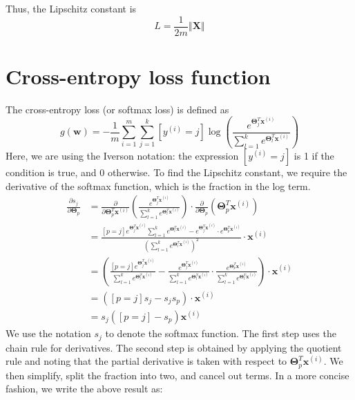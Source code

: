 \documentclass{article}
\begin{document}
Thus, the Lipschitz constant is
\[
    \boxed{
        L = \frac{1}{2m} \left\Vert \textbf{X} \right\Vert
    }
\]

\section{Cross-entropy loss function} 
The cross-entropy loss (or softmax loss) is defined as 
\[
    g(\textbf{w}) = -\frac{1}{m} \sum\limits_{i=1}^m \sum\limits_{j=1}^k [y^{(i)}=j] \log \left( \frac{e^{\boldsymbol\Theta_j^T \textbf{x}^{(i)}}}{\sum_{l=1}^k e^{\boldsymbol\Theta_l^T \textbf{x}^{(i)}}} \right)
\]
Here, we are using the Iverson notation: the expression $[y^{(i)}=j]$ is 1 if the condition is true, and 0 otherwise. To find the Lipschitz constant, we require the derivative of the softmax function, which is the fraction in the log term.
\[
    \begin{aligned} \frac{\partial s_j}{\partial \boldsymbol\Theta_p} &= \frac{\partial}{\partial \boldsymbol\Theta^T_p \textbf{x}^{(i)}} \left( \frac{e^{\boldsymbol\Theta^T_j \textbf{x}^{(i)}}}{\sum_{l=1}^k e^{\boldsymbol\Theta^T_l \textbf{x}^{(i)}}} \right) \cdot \frac{\partial}{\partial \boldsymbol\Theta_p} \left( \boldsymbol\Theta^T_p \textbf{x}^{(i)} \right)  \\ &= \frac{[p=j] e^{\boldsymbol\Theta^T_j \textbf{x}^{(i)}}\sum_{l=1}^k e^{\boldsymbol\Theta^T_l \textbf{x}^{(i)}} - e^{\boldsymbol\Theta^T_j \textbf{x}^{(i)}} \cdot e^{\boldsymbol\Theta^T_p \textbf{x}^{(i)}} }{\left( \sum_{l=1}^k e^{\boldsymbol\Theta^T_l \textbf{x}^{(i)}} \right)^2} \cdot \textbf{x}^{(i)} \\ &= \left( \frac{[p=j] e^{\boldsymbol\Theta^T_j \textbf{x}^{(i)}}}{\sum_{l=1}^k e^{\boldsymbol\Theta^T_l \textbf{x}^{(i)}}} - \frac{e^{\boldsymbol\Theta^T_j \textbf{x}^{(i)}}}{\sum_{l=1}^k e^{\boldsymbol\Theta^T_l \textbf{x}^{(i)}}} \cdot \frac{e^{\boldsymbol\Theta^T_p \textbf{x}^{(i)}}}{\sum_{l=1}^k e^{\boldsymbol\Theta^T_l \textbf{x}^{(i)}}} \right) \cdot \textbf{x}^{(i)} \\ &= \left([p=j] s_j - s_j s_p \right) \cdot \textbf{x}^{(i)} \\ &= s_j([p=j]-s_p)\textbf{x}^{(i)} \end{aligned}
\]
We use the notation $s_j$ to denote the softmax function. The first step uses the chain rule for derivatives. The second step is obtained by applying the quotient rule and noting that the partial derivative is taken with respect to $\boldsymbol\Theta_p^T \textbf{x}^{(i)}$. We then simplify, split the fraction into two, and cancel out terms. In a more concise fashion, we write the above result as:
\end{document}
